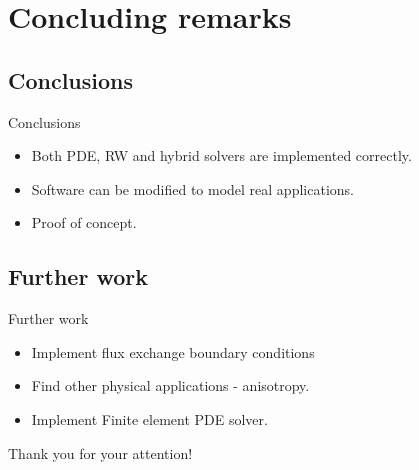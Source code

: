 \documentclass[12pt,a4paper, xcolor={usenames,dvipsnames,svgnames,table}]{beamer}
\begin{document}
\section{Concluding remarks}
\subsection{Conclusions}
\begin{frame}[shrink]{Conclusions}
\begin{itemize}
\item<2-> Both PDE, RW and hybrid solvers are implemented correctly.
\item<3-> Software can be modified to model real applications.
\item<4-> Proof of concept.
\end{itemize}
\end{frame} 
\notetoself{}

\subsection{Further work}
\begin{frame}[shrink]{Further work}
\begin{itemize}
\item<2-> Implement flux exchange boundary conditions
\item<3-> Find other physical applications - anisotropy.
\item<4-> Implement Finite element PDE solver.
\end{itemize}
\end{frame}
\notetoself{}


\begin{frame}[plain]
Thank you for your attention!
\end{frame}
\end{document}
